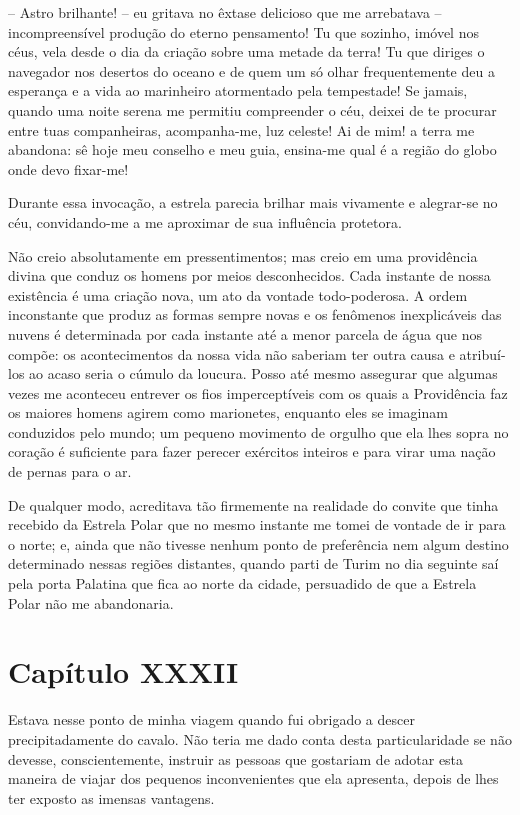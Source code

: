  -- Astro brilhante! -- eu gritava no êxtase delicioso que me arrebatava -- 
incompreensível produção do eterno pensamento! Tu que sozinho, imóvel
nos céus, vela desde o dia da criação sobre uma metade da terra! Tu que
diriges o navegador nos desertos do oceano e de quem um só olhar
frequentemente deu a esperança e a vida ao marinheiro atormentado pela
tempestade! Se jamais, quando uma noite serena me permitiu compreender
o céu, deixei de te procurar entre tuas companheiras, acompanha-me, luz
celeste! Ai de mim! a terra me abandona: sê hoje meu conselho e meu
guia, ensina-me qual é a região do globo onde devo fixar-me!

 Durante essa invocação, a estrela parecia brilhar mais vivamente e
alegrar-se no céu, convidando-me a me aproximar de sua influência
protetora.

 Não creio absolutamente em pressentimentos; mas creio em uma
providência divina que conduz os homens por meios desconhecidos. Cada
instante de nossa existência é uma criação nova, um ato da vontade
todo-poderosa. A ordem inconstante que produz as formas sempre novas e
os fenômenos inexplicáveis das nuvens é determinada por cada instante
até a menor parcela de água que nos compõe: os acontecimentos da nossa
vida não saberiam ter outra causa e atribuí-los ao acaso seria o cúmulo
da loucura. Posso até mesmo assegurar que algumas vezes me aconteceu
entrever os fios imperceptíveis com os quais a Providência faz os
maiores homens agirem como marionetes, enquanto eles se imaginam
conduzidos pelo mundo; um pequeno movimento de orgulho que ela lhes
sopra no coração é suficiente para fazer perecer exércitos inteiros e
para virar uma nação de pernas para o ar. 

 De qualquer modo, acreditava tão firmemente na realidade do convite que
tinha recebido da Estrela Polar que no mesmo instante me tomei de
vontade de ir para o norte; e, ainda que não tivesse nenhum ponto de
preferência nem algum destino determinado nessas regiões distantes,
quando parti de Turim no dia seguinte saí pela porta Palatina que fica
ao norte da cidade, persuadido de que a Estrela Polar não me
abandonaria. 

\section*{Capítulo XXXII}

 Estava nesse ponto de minha viagem quando fui obrigado a descer
precipitadamente do cavalo. Não teria me dado conta desta
particularidade se não devesse, conscientemente, instruir as pessoas
que gostariam de adotar esta maneira de viajar dos pequenos
inconvenientes que ela apresenta, depois de lhes ter exposto as
imensas vantagens.

